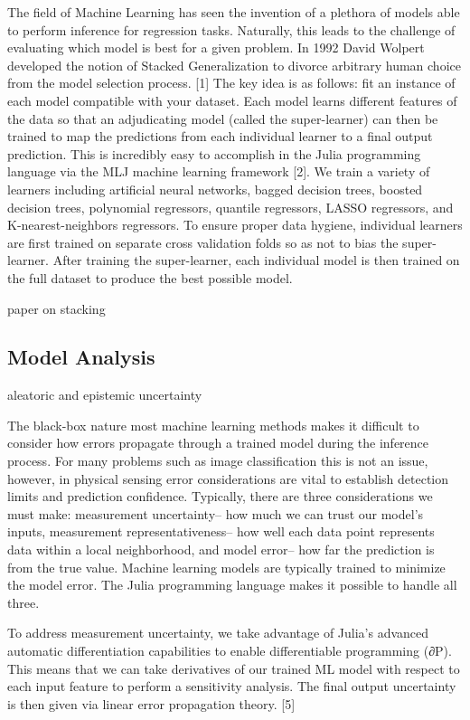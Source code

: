 \documentclass[remotesensing,article,submit,pdftex,moreauthors]{Definitions/mdpi}
\begin{document}
The field of Machine Learning has seen the invention of a plethora of models able to perform inference for regression tasks. Naturally, this leads to the challenge of evaluating which model is best for a given problem. In 1992 David Wolpert developed the notion of Stacked Generalization to divorce arbitrary human choice from the model selection process. [1] The key idea is as follows: fit an instance of each model compatible with your dataset. Each model learns different features of the data so that an adjudicating model (called the super-learner) can then be trained to map the predictions from each individual learner to a final output prediction. This is incredibly easy to accomplish in the Julia programming language via the MLJ machine learning framework [2]. We train a variety of learners including artificial neural networks, bagged decision trees, boosted decision trees, polynomial regressors, quantile regressors, LASSO regressors, and K-nearest-neighbors regressors. To ensure proper data hygiene, individual learners are first trained on separate cross validation folds so as not to bias the super-learner. After training the super-learner, each individual model is then trained on the full dataset to produce the best possible model.


paper on stacking \cite{ModelStacking}

\subsection{Model Analysis}
aleatoric and epistemic uncertainty

The black-box nature most machine learning methods makes it difficult to consider how errors propagate through a trained model during the inference process. For many problems such as image classification this is not an issue, however, in physical sensing error considerations are vital to establish detection limits and prediction confidence. Typically, there are three considerations we must make: measurement uncertainty– how much we can trust our model’s inputs, measurement representativeness– how well each data point represents data within a local neighborhood, and model error– how far the prediction is from the true value. Machine learning models are typically trained to minimize the model error. The Julia programming language makes it possible to handle all three. 


To address measurement uncertainty, we take advantage of Julia’s advanced automatic differentiation capabilities to enable differentiable programming (∂P). This means that we can take derivatives of our trained ML model with respect to each input feature to perform a sensitivity analysis. The final output uncertainty is then given via linear error propagation theory. [5]
\end{document}

